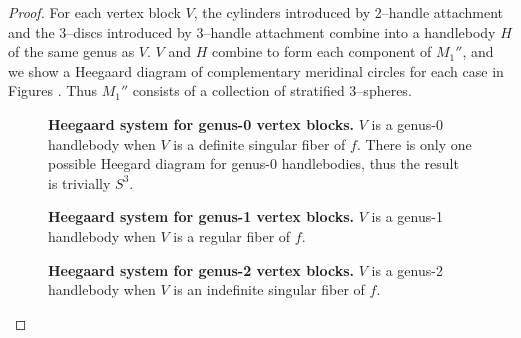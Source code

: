 \begin{proof}
	For each vertex block $V$, the cylinders introduced by 2--handle attachment and the 3--discs introduced by 3--handle attachment combine into a handlebody $H$ of the same genus as $V$.
	$V$ and $H$ combine to form each component of $M_1''$, and we show a Heegaard diagram of complementary meridinal circles for each case in Figures .
	Thus $M_1''$ consists of a collection of stratified 3--spheres.
	
	\begin{figure}[h!]
		\caption{
			\textbf{Heegaard system for genus-0 vertex blocks.}
			$V$ is a genus-0 handlebody when $V$ is a definite singular fiber of $f$.
			There is only one possible Heegard diagram for genus-0 handlebodies, thus the result is trivially $S^3$.
		}
		\label{fig:heegaard-genus-0}
	\end{figure}

	\begin{figure}[h!]
		\caption{
			\textbf{Heegaard system for genus-1 vertex blocks.}
			$V$ is a genus-1 handlebody when $V$ is a regular fiber of $f$.
		}
		\label{fig:heegaard-genus-1}
	\end{figure}

	\begin{figure}[h!]
		\caption{
			\textbf{Heegaard system for genus-2 vertex blocks.}
			$V$ is a genus-2 handlebody when $V$ is an indefinite singular fiber of $f$.
		}
		\label{fig:heegaard-genus-2}
	\end{figure}

	
	
\end{proof}


